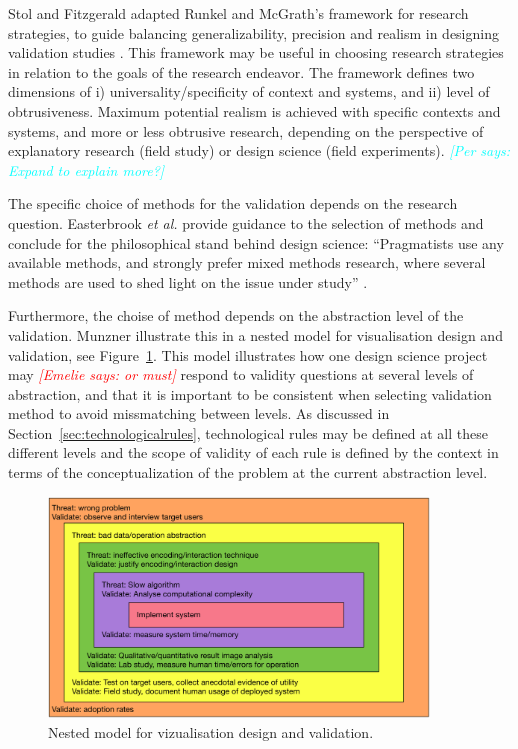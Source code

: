 \documentclass[graybox]{svmult}
\newcommand{\emelie}[1]{\textcolor{red}{{\it [Emelie says: #1]}}}
\newcommand{\per}[1]{\textcolor{cyan}{{\it [Per says: #1]}}}
\newcommand{\emelie}[1]{}
\newcommand{\per}[1]{}
\begin{document}
Stol and Fitzgerald adapted Runkel and McGrath's framework for research strategies, to guide balancing generalizability, precision and realism in designing validation studies \cite{StolABC18}. This framework may be useful in choosing research strategies in relation to the goals of the research endeavor. The framework defines two dimensions of i) universality/specificity of context and systems, and ii) level of obtrusiveness. Maximum potential realism is achieved with specific contexts and systems, and more or less obtrusive research, depending on the perspective of explanatory research (field study) or design science (field experiments). \per{Expand to explain more?} 

The specific choice of methods for the validation depends on the research question. Easterbrook \emph{et al.} provide guidance to the selection of methods and conclude for the philosophical stand behind design science: ``Pragmatists use any available methods, and strongly prefer mixed methods research, where several methods are used to shed light on the issue under study'' \cite{easterbrook_selecting_2008}. 

Furthermore, the choise of method depends on the abstraction level of the validation. Munzner illustrate this in a nested model for visualisation design and validation, see Figure~\ref{fig:nested_model}. This model illustrates how one design science project may \emelie{or must} respond to validity questions at several levels of abstraction, and that it is important to be consistent when selecting validation method to avoid missmatching between levels. As discussed in Section~\ref{sec:technologicalrules}, technological rules may be defined at all these different levels and the scope of validity of each rule is defined by the context in terms of the conceptualization of the problem at the current abstraction level.

\begin{figure}[t]
  \includegraphics[width=0.9\textwidth]{Figures/nested_model.pdf}
\caption{Nested model for vizualisation design and validation\cite{munzner2009}.}
\label{fig:nested_model}       %
\end{figure} 
\end{document}
